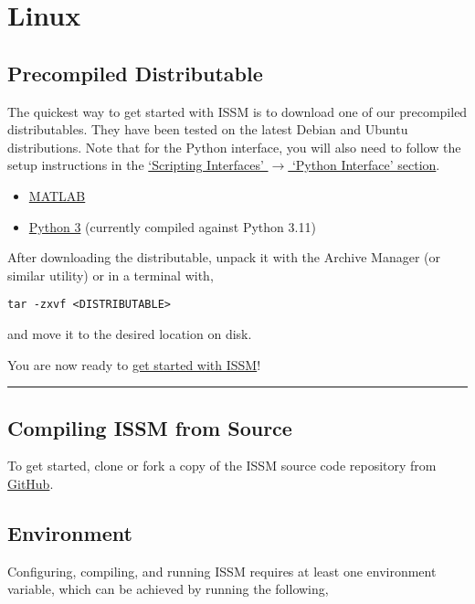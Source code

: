 
\section{Linux} \label{sec:installation-linux}
\subsection{Precompiled Distributable}
The quickest way to get started with ISSM is to download one of our precompiled distributables. They have been tested on the latest Debian and Ubuntu distributions. Note that for the Python interface, you will also need to follow the setup instructions in the \hyperref[sec:linux-python-interface]{`Scripting Interfaces' $\rightarrow$ `Python Interface' section}.
\begin{itemize}
	\item \href{https://ross.ics.uci.edu/ISSM-Linux-MATLAB.tar.gz}{MATLAB}
	\item \href{https://ross.ics.uci.edu/ISSM-Linux-Python-3.tar.gz}{Python 3} (currently compiled against Python 3.11)
\end{itemize}

After downloading the distributable, unpack it with the Archive Manager (or similar utility) or in a terminal with,
\begin{lstlisting}
tar -zxvf <DISTRIBUTABLE>
\end{lstlisting}
and move it to the desired location on disk.

You are now ready to 
\hyperref[chap:getting-started]{get started with ISSM}!

\vspace{1cm}\hrule

\subsection{Compiling ISSM from Source}
To get started, clone or fork a copy of the ISSM source code repository from \href{https://github.com/ISSMteam/ISSM}{GitHub}.

\subsection{Environment}
Configuring, compiling, and running ISSM requires at least one environment variable, which can be achieved by running the following,

